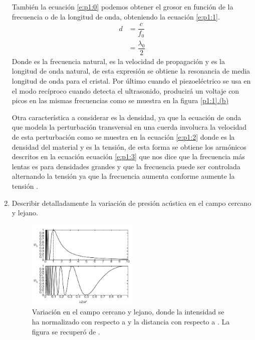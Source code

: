 \begin{enumerate}
También la ecuación \ref{e:p1:0} podemos obtener el grosor en función de la frecuencia o de la longitud de onda, obteniendo la ecuación \ref{e:p1:1}.
\begin{equation}
  \begin{split}
    d&=\dfrac{c}{f_0}\\
  &=\dfrac{\lambda_0}{2}
  \end{split}
  \label{e:p1:1}
\end{equation}
Donde  es la frecuencia natural,  es la velocidad de propagación y  es la longitud de onda natural, de esta expresión se obtiene la resonancia de media longitud de onda para el cristal. Por último cuando el piezoeléctrico se usa en el modo recíproco cuando detecta el ultrasonido, producirá un voltaje con picos en las mismas frecuencias como se muestra en la figura \hyperref[p1:1]{\ref{p1:1}.(b)} \citep{matthew,IM}

  Otra característica a considerar es la densidad, ya que la ecuación de onda que modela la perturbación transversal en una cuerda involucra la velocidad de esta perturbación como se muestra en la ecuación \ref{e:p1:2} donde \ec{\rho} es la densidad del material y  es la tensión, de esta forma se obtiene los armónicos descritos en la ecuación ecuación \ref{e:p1:3} que nos dice que la frecuencia más lentas es para densidades grandes y que la frecuencia puede ser controlada alternando la tensión ya que la frecuencia aumenta conforme aumente la tensión \citep{haim}.


  \item Describir detalladamente la variación de presión acústica en el campo cercano y lejano.
  
  
  
  \begin{adjustbox}{valign=T,raise=\strutheight,minipage={\linewidth}}
    \begin{figure}
      \centering
      \captionsetup{margin=5pt}
      \includegraphics[width=0.5\textwidth]{./figuras/p2_0.pdf}
      \caption{Variación en el campo cercano y lejano, donde la intensidad  se ha normalizado con respecto a  y la distancia  con respecto a . La figura se recuperó de \citet{haim}.}
      \label{p2:0}
    \end{figure}
  \strut{}  
  

\end{adjustbox}
\end{enumerate}
